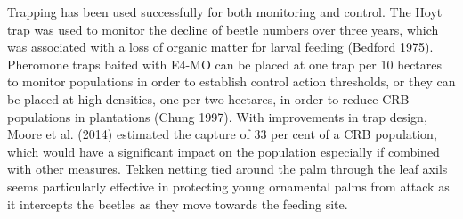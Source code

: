 \documentclass[twocolumn,letterpaper]{scrartcl}
\begin{document}
Trapping has been used successfully for both monitoring and control. The Hoyt trap was used to monitor the 
decline of beetle numbers over three years, which was associated with a loss of organic matter for larval feeding 
(Bedford 1975). Pheromone traps baited with E4-MO can be placed at one trap per 10 hectares to monitor 
populations in order to establish control action thresholds, or they can be placed at high densities, one per two 
hectares, in order to reduce CRB populations in plantations (Chung 1997). With improvements in trap design, 
Moore et al. (2014) estimated the capture of 33 per cent of a CRB population, which would have a significant 
impact on the population especially if combined with other measures. Tekken netting tied around the palm 
through  the  leaf  axils  seems  particularly  effective  in  protecting  young  ornamental  palms  from  attack  as  it 
intercepts the beetles as they move towards the feeding site. 

\end{document}

